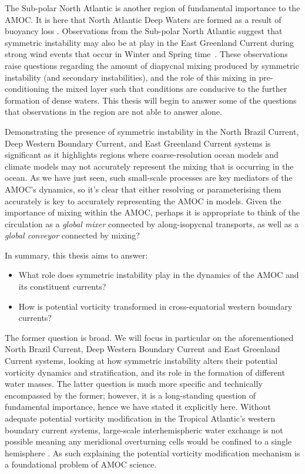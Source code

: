 
The Sub-polar North Atlantic is another region of fundamental importance to the AMOC. It is here that North Atlantic Deep Waters are formed as a result of buoyancy loss \citep[e.g.]{Marshall1999, Pickart2003, DeJong2016, Lozier2019}. Observations from the Sub-polar North Atlantic suggest that symmetric instability may also be at play in the East Greenland Current during strong wind events that occur in Winter and Spring time~\citep{LeBras2022}. These observations raise questions regarding the amount of diapycnal mixing produced by symmetric instability (and secondary instabilities), and the role of this mixing in pre-conditioning the mixed layer such that conditions are conducive to the further formation of dense waters. This thesis will begin to answer some of the questions that observations in the region are not able to answer alone.

Demonstrating the presence of symmetric instability in the North Brazil Current, Deep Western Boundary Current, and East Greenland Current systems is significant as it highlights regions where coarse-resolution ocean models and climate models may not accurately represent the mixing that is occurring in the ocean. As we have just seen, such small-scale processes are key mediators of the AMOC's dynamics, so it's clear that either resolving or parameterising them accurately is key to accurately representing the AMOC in models. Given the importance of mixing within the AMOC, perhaps it is appropriate to think of the circulation as a \textit{global mixer} connected by along-isopycnal transports, as well as a \textit{global conveyor} connected by mixing?

In summary, this thesis aims to answer:
\begin{itemize}
    \item What role does symmetric instability play in the dynamics of the AMOC and its constituent currents?
    \item How is potential vorticity transformed in cross-equatorial western boundary currents?
\end{itemize}
The former question is broad. We will focus in particular on the aforementioned North Brazil Current, Deep Western Boundary Current and East Greenland Current systems, looking at how symmetric instability alters their potential vorticity dynamics and stratification, and its role in the formation of different water masses. The latter question is much more specific and technically encompassed by the former; however, it is a long-standing question of fundamental importance, hence we have stated it explicitly here. Without adequate potential vorticity modification in the Tropical Atlantic's western boundary current systems, large-scale interhemispheric water exchange is not possible meaning any meridional overturning cells would be confined to a single hemisphere \citep{Csanady1985,  Nof1990, Killworth1991, Johnson1993}. As such explaining the potential vorticity modification mechanism is a foundational problem of AMOC science.

